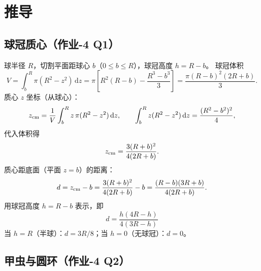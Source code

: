 \documentclass[UTF8,a4paper,11pt]{ctexart}
\begin{document}
\section{推导}
\label{sec:derive}

\subsection{球冠质心（作业-4 Q1）}
\label{sub:spherical-cap}

球半径 $R$，切割平面距球心 $b$（$0\le b\le R$），球冠高度 $h=R-b$。
球冠体积
\begin{equation}
  V=\int_{b}^{R}\pi(R^2-z^2)\,\mathrm dz
  =\pi\left[R^2(R-b)-\frac{R^3-b^3}{3}\right]
  =\frac{\pi(R-b)^2(2R+b)}{3}.
\end{equation}
质心 $z$ 坐标（从球心）：
\begin{equation}
  z_{\rm cm}=\frac{1}{V}\int_b^R z\,\pi(R^2-z^2)\,\mathrm dz,
  \qquad
  \int_b^R z(R^2-z^2)\,\mathrm dz
  =\frac{(R^2-b^2)^2}{4},
\end{equation}
代入体积得
\begin{equation}
  z_{\rm cm}=\frac{3(R+b)^2}{4(2R+b)}.
\end{equation}
质心距底面（平面 $z=b$）的距离：
\begin{equation}
  d=z_{\rm cm}-b
  =\frac{3(R+b)^2}{4(2R+b)}-b
  =\frac{(R-b)(3R+b)}{4(2R+b)}.
\end{equation}
用球冠高度 $h=R-b$ 表示，即
\begin{equation}
  \boxed{\;d=\frac{h(4R-h)}{4(3R-h)}\;}
\end{equation}
当 $h=R$（半球）：$d=3R/8$；当 $h=0$（无球冠）：$d=0$。

\subsection{甲虫与圆环（作业-4 Q2）}
\label{sub:beetle}
\end{document}
